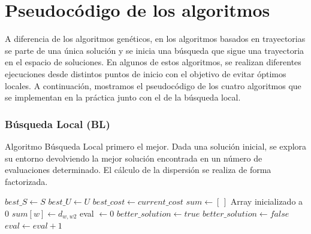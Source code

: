 \part{Pseudocódigo de los algoritmos}
A diferencia de los algoritmos genéticos, en los algoritmos basados en trayectorias se parte de una única solución y se inicia una búsqueda que sigue una trayectoria en el espacio de soluciones. En algunos de estos algoritmos, se realizan diferentes ejecuciones desde distintos puntos de inicio con el objetivo de evitar óptimos locales. A continuación, mostramos el pseudocódigo de los cuatro algoritmos que se implementan en la práctica junto con el de la búsqueda local.

\section{Búsqueda Local (BL)}
\begin{algorithm}[H]
\caption{Algoritmo Búsqueda Local primero el mejor. Dada una solución inicial, se explora su entorno devolviendo la mejor solución encontrada en un número de evaluaciones determinado. El cálculo de la dispersión se realiza de forma factorizada.}
\begin{algorithmic}[1]
    \State $best\_S \leftarrow S$
    \State $best\_U \leftarrow U$
    \State $best\_cost \leftarrow current\_cost$
    \State 
    \State $sum \gets [ \, ]$ \Comment Array inicializado a 0
            \State $sum[w] \leftarrow d_{w,w2}$
        \EndFor
    \EndFor
    \State
    \State eval $\gets 0$
    \State $better\_solution \gets true$
    \State
        \State $better\_solution \gets false$
        \State
                \State $eval \gets eval+1$
                
                \State
{}
\end{algorithmic}
\end{algorithm}

